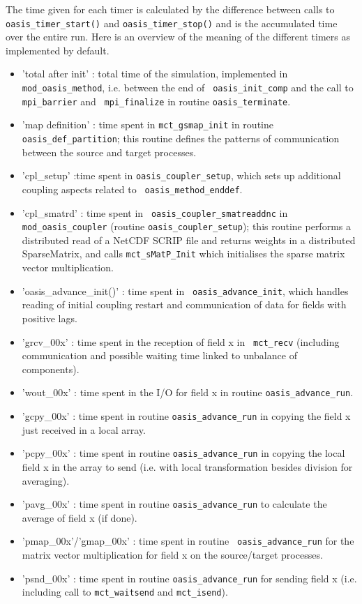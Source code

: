 The time given for each timer is calculated by the difference between
calls to {\tt oasis\_timer\_start()} and {\tt oasis\_timer\_stop()}
and is the accumulated time over the entire run. Here is an overview
of the meaning of the different timers as implemented by default.

\begin{itemize}
\item {'total after init'} : total time of the simulation, implemented
  in {\tt mod\_oasis\_method}, i.e. between the end of {\tt
    oasis\_init\_comp} and the call to {\tt mpi\_barrier} and {\tt
    mpi\_finalize} in routine {\tt oasis\_terminate}.
\item {'map definition'} : time spent in {\tt mct\_gsmap\_init} in
  routine {\tt oasis\_def\_partition}; this routine defines the
  patterns of communication between the source and target processes.
\item {'cpl\_setup'} :time spent in {\tt oasis\_coupler\_setup}, which
  sets up additional coupling aspects related to {\tt
    oasis\_method\_enddef}.
\item {'cpl\_smatrd'} : time spent in {\tt
    oasis\_coupler\_smatreaddnc} in {\tt mod\_oasis\_coupler} (routine
  {\tt oasis\_coupler\_setup}); this routine performs a distributed
  read of a NetCDF SCRIP file and returns weights in a distributed
  SparseMatrix, and calls {\tt mct\_sMatP\_Init} which initialises the
  sparse matrix vector multiplication.
\item {'oasis\_advance\_init()'} : time spent in {\tt
    oasis\_advance\_init}, which handles reading of initial coupling
  restart and communication of data for fields with positive lags.
\item {'grcv\_00x'} : time spent in the reception of field x in {\tt
    mct\_recv} (including communication and possible waiting time
  linked to unbalance of components).
\item {'wout\_00x'} : time spent in the I/O for field x in routine
  {\tt oasis\_advance\_run}.
\item {'gcpy\_00x'} : time spent in routine {\tt oasis\_advance\_run}
  in copying the field x just received in a local array.
\item {'pcpy\_00x'} : time spent in routine {\tt oasis\_advance\_run}
  in copying the local field x in the array to send (i.e. with local
  transformation besides division for averaging).
\item {'pavg\_00x'} : time spent in routine {\tt oasis\_advance\_run}
  to calculate the average of field x (if done).
\item {'pmap\_00x'/'gmap\_00x'} : time spent in routine {\tt
    oasis\_advance\_run} for the matrix vector multiplication for
  field x on the source/target processes.
\item {'psnd\_00x'} : time spent in routine {\tt oasis\_advance\_run}
  for sending field x (i.e. including call to {\tt mct\_waitsend} and
  {\tt mct\_isend}).
\end{itemize}

